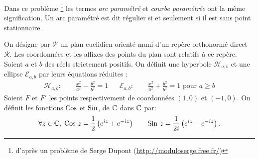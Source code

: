 \def\Cos{\textnormal{Cos}}
\def\Sin{\textnormal{Sin}}
Dans ce problème \footnote{d'après un problème de Serge Dupont (\href{http://moduloserge.free.fr/}{http://moduloserge.free.fr/}) } les termes \emph{arc paramétré} et \emph{courbe paramétrée} ont la même signification. Un arc paramétré est dit régulier si et seulement si il est sans point stationnaire.

On désigne par $\mathcal P$ un plan euclidien orienté muni d'un repère orthonormé direct $\mathcal R$. Les coordonnées et les affixes des points du plan sont relatifs à ce repère.\newline
Soient $a$ et $b$ des réels strictement positifs. On définit une hyperbole  $\mathcal H_ {a,b}$ et une ellipse $\mathcal E_{a,b}$ par leurs équations réduites :
\begin{align*}
 \mathcal H_ {a,b} :\qquad \frac{x^2}{a^2} - \frac{y^2}{b^2} = 1 & &
 \mathcal E_{a,b} :\qquad \frac{x^2}{a^2} + \frac{y^2}{b^2} = 1 \text{ pour }a\geq b
\end{align*}
Soient $F$ et $F'$ les points respectivement de coordonnées $(1,0)$ et $(-1,0)$.\newline
On définit les fonctions $\Cos$ et $\Sin$, de $\mathbb{C}$ dans $\mathbb{C}$ par:
$$ \forall z\in \C, \;\Cos\ z = \frac12 \left(e^{iz} + e^{-iz}\right) \qquad 
\Sin\ z = \frac1{2i} \left( e^{iz} - e^{-iz}\right).$$


